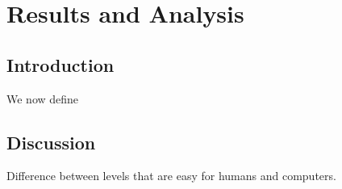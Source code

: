\chapter{Results and Analysis}
\label{cha:analysis}

\section{Introduction}
We now define 

\section{Discussion}
Difference between levels that are easy for humans and computers.
